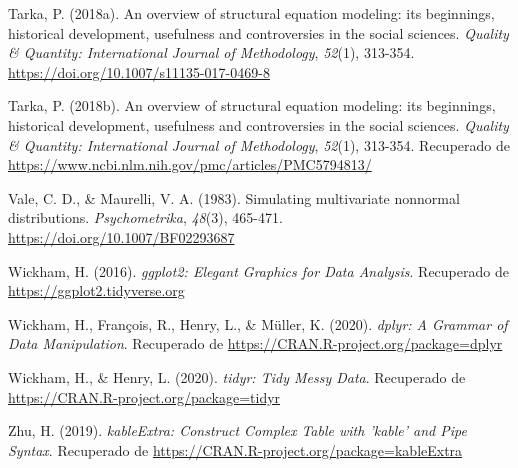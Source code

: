 \documentclass[
]{article}
\newlength{\cslhangindent}
\newenvironment{cslreferences}%
  {\setlength{\parindent}{0pt}%
  \everypar{\setlength{\hangindent}{\cslhangindent}}\ignorespaces}%
  {\par}
\begin{document}
\begin{cslreferences}
\leavevmode\hypertarget{ref-tarka}{}%
Tarka, P. (2018a). An overview of structural equation modeling: its
beginnings, historical development, usefulness and controversies in the
social sciences. \emph{Quality \& Quantity: International Journal of
Methodology}, \emph{52}(1), 313-354.
\url{https://doi.org/10.1007/s11135-017-0469-8}

\leavevmode\hypertarget{ref-Tarka}{}%
Tarka, P. (2018b). An overview of structural equation modeling: its
beginnings, historical development, usefulness and controversies in the
social sciences. \emph{Quality \& Quantity: International Journal of
Methodology}, \emph{52}(1), 313-354. Recuperado de
\url{https://www.ncbi.nlm.nih.gov/pmc/articles/PMC5794813/}

\leavevmode\hypertarget{ref-Vale1983}{}%
Vale, C. D., \& Maurelli, V. A. (1983). Simulating multivariate
nonnormal distributions. \emph{Psychometrika}, \emph{48}(3), 465-471.
\url{https://doi.org/10.1007/BF02293687}

\leavevmode\hypertarget{ref-ggplot2}{}%
Wickham, H. (2016). \emph{ggplot2: Elegant Graphics for Data Analysis}.
Recuperado de \url{https://ggplot2.tidyverse.org}

\leavevmode\hypertarget{ref-dplyr}{}%
Wickham, H., François, R., Henry, L., \& Müller, K. (2020). \emph{dplyr:
A Grammar of Data Manipulation}. Recuperado de
\url{https://CRAN.R-project.org/package=dplyr}

\leavevmode\hypertarget{ref-tidyr}{}%
Wickham, H., \& Henry, L. (2020). \emph{tidyr: Tidy Messy Data}.
Recuperado de \url{https://CRAN.R-project.org/package=tidyr}

\leavevmode\hypertarget{ref-kableExtra}{}%
Zhu, H. (2019). \emph{kableExtra: Construct Complex Table with 'kable'
and Pipe Syntax}. Recuperado de
\url{https://CRAN.R-project.org/package=kableExtra}
\end{cslreferences}
\end{document}
